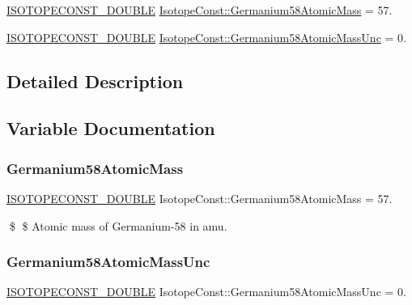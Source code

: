 \begin{DoxyCompactItemize}
\item 
\mbox{\hyperlink{group___isotope_const-_macros_ga8f45a7272ce02c0b4c65c44636ed719a}{I\+S\+O\+T\+O\+P\+E\+C\+O\+N\+S\+T\+\_\+\+D\+O\+U\+B\+LE}} \mbox{\hyperlink{group___isotope_const-_germanium-_ge58_ga67a3f251ab8f8afc84ce198f8a5e97a1}{Isotope\+Const\+::\+Germanium58\+Atomic\+Mass}} = 57.
\item 
\mbox{\hyperlink{group___isotope_const-_macros_ga8f45a7272ce02c0b4c65c44636ed719a}{I\+S\+O\+T\+O\+P\+E\+C\+O\+N\+S\+T\+\_\+\+D\+O\+U\+B\+LE}} \mbox{\hyperlink{group___isotope_const-_germanium-_ge58_gacf951562a44cfc107841df5904b54a67}{Isotope\+Const\+::\+Germanium58\+Atomic\+Mass\+Unc}} = 0.
\end{DoxyCompactItemize}


\subsection{Detailed Description}


\subsection{Variable Documentation}
\mbox{\label{group___isotope_const-_germanium-_ge58_ga67a3f251ab8f8afc84ce198f8a5e97a1}} 
\subsubsection{\texorpdfstring{Germanium58\+Atomic\+Mass}{Germanium58AtomicMass}}
{\footnotesize\ttfamily \mbox{\hyperlink{group___isotope_const-_macros_ga8f45a7272ce02c0b4c65c44636ed719a}{I\+S\+O\+T\+O\+P\+E\+C\+O\+N\+S\+T\+\_\+\+D\+O\+U\+B\+LE}} Isotope\+Const\+::\+Germanium58\+Atomic\+Mass = 57.}

\$ \$ Atomic mass of Germanium-\/58 in amu. \mbox{\label{group___isotope_const-_germanium-_ge58_gacf951562a44cfc107841df5904b54a67}} 
\subsubsection{\texorpdfstring{Germanium58\+Atomic\+Mass\+Unc}{Germanium58AtomicMassUnc}}
{\footnotesize\ttfamily \mbox{\hyperlink{group___isotope_const-_macros_ga8f45a7272ce02c0b4c65c44636ed719a}{I\+S\+O\+T\+O\+P\+E\+C\+O\+N\+S\+T\+\_\+\+D\+O\+U\+B\+LE}} Isotope\+Const\+::\+Germanium58\+Atomic\+Mass\+Unc = 0.}

